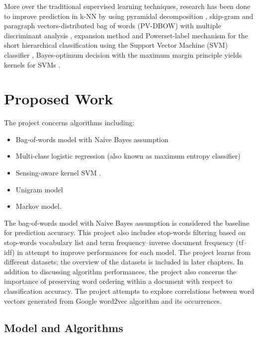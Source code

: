 \documentclass[a4paper, 11pt]{article}
\begin{document}
More over the traditional supervised learning techniques, research has been done to improve prediction in k-NN by using pyramidal decomposition \cite{heroux1998classification},  skip-gram and paragraph vectors-distributed bag of words (PV-DBOW) with multiple discriminant analysis \cite{lauren2018discriminant}, expansion method and Powerset-label mechanism for the short hierarchical classification using the Support Vector Machine (SVM) classifier \cite{salih2018term}, Bayes-optimum decision with the maximum margin principle yields kernels for SVMs \cite{ding2014sensing}.



\section{Proposed Work}
The project concerns algorithms including:
\begin{itemize}
\item Bag-of-words model with Naive Bayes assumption
\item Multi-class logistic regression (also known as maximum entropy classifier)
\item Sensing-aware kernel SVM \cite{ding2014sensing}.
\item Unigram model
\item Markov model.
\end{itemize}
The bag-of-words model with Naive Bayes assumption is considered the baseline for prediction accuracy. This project also includes stop-words filtering based on stop-words vocabulary list and term frequency–inverse document frequency (tf–idf) in attempt to improve performances for each model. The project learns from different datasets; the overview of the datasets is included in later chapters. In addition to discussing algorithm performances, the project also concerns the importance of preserving word ordering within a document with respect to classification accuracy. The project attempts to explore correlations between word vectors generated from Google word2vec algorithm and its occurrences. 
\subsection{Model and Algorithms}
\end{document}
